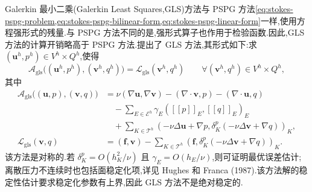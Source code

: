 \begin{note}\label{note:stokes-gls-method}
Galerkin 最小二乘(Galerkin Least Squares,GLS)方法与 PSPG 方法\cref{eq:stokes-pspg-problem,eq:stokes-pspg-bilinear-form,eq:stokes-pspg-linear-form}一样,使用方程强形式的残量.与 PSPG 方法不同的是,强形式算子也作用于检验函数.因此,GLS 方法的计算开销略高于 PSPG 方法.\textcite{HughesFranca1987}提出了 GLS 方法,其形式如下:求 $(\bm{u}^h,p^h)\in V^h\times Q^h$,使得
\begin{equation}\label{eq:stokes-gls-problem}
 \mathcal{A}_{\mathrm{gls}}\bigl((\bm{u}^h,p^h),
                  (\bm{v}^h,q^h)\bigr)
 =\mathcal{L}_{\mathrm{gls}}(\bm{v}^h,q^h)
 \qquad\forall(\bm{v}^h,q^h)\in V^h\times Q^h,
\end{equation}
其中
\begin{equation}\label{eq:stokes-gls-forms}
\begin{aligned}
 \mathcal{A}_{\mathrm{gls}}\bigl((\bm{u},p),(\bm{v},q)\bigr)
 &=\nu(\nabla\bm{u},\nabla\bm{v})
   -(\nabla\cdot\bm{v},p)-(\nabla\cdot\bm{u},q)\\
 &\quad-\sum_{E\in\mathcal{E}^h}
       \gamma_E([[p]]_E,[[q]]_E)_E\\
 &\quad+\sum_{K\in\mathcal{T}^h}
       (-\nu\Delta\bm{u}+\nabla p,
         \delta_K^p(-\nu\Delta\bm{v}+\nabla q))_K,\\
 \mathcal{L}_{\mathrm{gls}}(\bm{v},q)
 &=(\bm{f},\bm{v})
   -\sum_{K\in\mathcal{T}^h}
       (\bm{f},\delta_K^p(-\nu\Delta\bm{v}+\nabla q))_K.
\end{aligned}
\end{equation}
该方法是对称的.若 $\delta_K^p=O(h_K^2/\nu)$ 且 $\gamma_E=O(h_E/\nu)$,则可证明最优误差估计;离散压力不连续时也包括面稳定化项,详见 Hughes 和 Franca (1987).该方法解的稳定性估计要求稳定化参数有上界,因此 GLS 方法不是绝对稳定的.
\end{note}

